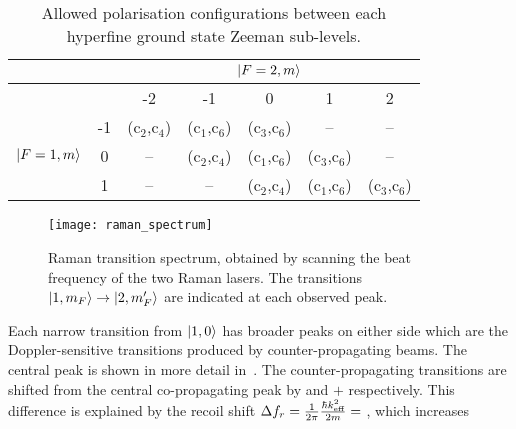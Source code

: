 \begin{table}
  \centering
  \begin{tabular}{ccccccc}
    \toprule
     & & \multicolumn{5}{c}{\(\ket{F=2,m}\)} \\
     \midrule
     & & -2 & -1 & 0 & 1 & 2 \\
     \multirow{3}{*}{\(\ket{F=1,m}\)} & -1 & (c\(_2\),c\(_4\)) &
     (c\(_1\),c\(_6\)) &(c\(_3\),c\(_6\))& -- & --  \\
     & 0 &-- & (c\(_2\),c\(_4\))& (c\(_1\),c\(_6\)) & (c\(_3\),c\(_6\))
     &-- \\
     & 1 & --& --&(c\(_2\),c\(_4\))& (c\(_1\),c\(_6\)) & (c\(_3\),c\(_6\)) \\
    \bottomrule
  \end{tabular}
  \caption{Allowed polarisation configurations between each hyperfine
  ground state Zeeman sub-levels.}
  \label{tab:raman_polarisation}
\end{table}
\begin{figure}[htpb]
  \centering
  \texttt{[image: raman\_spectrum]}
  \caption[Raman transition spectrum]{Raman transition spectrum, obtained by scanning the beat
    frequency of the two Raman lasers. The transitions \(\ket{1,m_F}
  \rightarrow \ket{2,m_F'}\) are indicated at each observed peak.}
  \label{fig:raman_spectrum}
\end{figure}
\par\noindent
Each narrow transition from \(\ket{1,0}\) has broader
peaks on either side which are the Doppler-sensitive transitions
produced by counter-propagating beams.
The central peak is shown in more detail
in~. The counter-propagating
transitions are shifted from the central co-propagating peak by  and
\(+\) respectively. This difference is
explained by the recoil shift $\Delta f_r = \frac{1}{2\pi}\frac{\hbar
k^2_\textnormal{eff}}{2m} = $ , which increases
